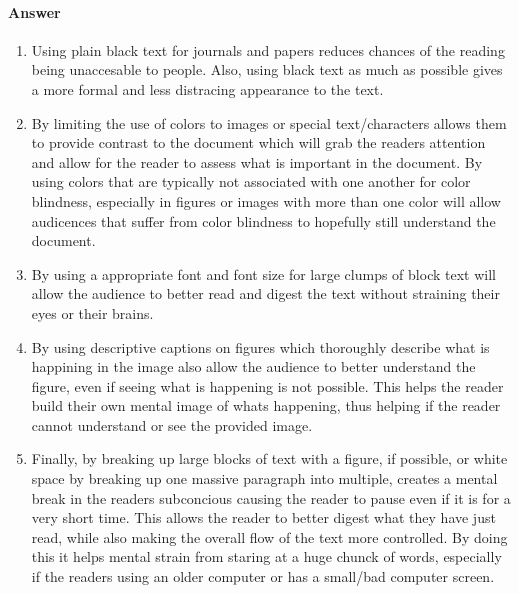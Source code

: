 \documentclass{article}
\begin{document}
\paragraph{Answer}
	\begin{enumerate}
		\item Using plain black text for journals and papers reduces chances of the reading being unaccesable to people. Also, using black text as much as possible gives a more formal and less distracing appearance to the text.
		\item By limiting the use of colors to images or special text/characters allows them to provide contrast to the document which will grab the readers attention and allow for the reader to assess what is important in the document. By using colors that are typically not associated with one another for color blindness, especially in figures or images with more than one color will allow audicences that suffer from color blindness to hopefully still understand the document.
		\item By using a appropriate font and font size for large clumps of block text will allow the audience to better read and digest the text without straining their eyes or their brains.
		\item By using descriptive captions on figures which thoroughly describe what is happining in the image also allow the audience to better understand the figure, even if seeing what is happening is not possible. This helps the reader build their own mental image of whats happening, thus helping if the reader cannot understand or see the provided image.
		\item Finally, by breaking up large blocks of text with a figure, if possible, or white space by breaking up one massive paragraph into multiple, creates a mental break in the readers subconcious causing the reader to pause even if it is for a very short time. This allows the reader to better digest what they have just read, while also making the overall flow of the text more controlled. By doing this it helps mental strain from staring at a huge chunck of words, especially if the readers using an older computer or has a small/bad computer screen.

	\end{enumerate}

 
\end{document}
